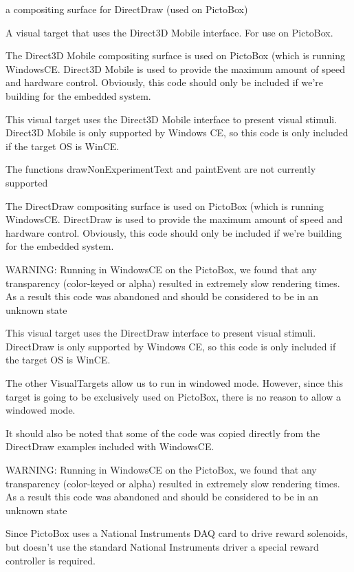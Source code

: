 a compositing surface for Direct\-Draw (used on Picto\-Box)

A visual target that uses the Direct3\-D Mobile interface. For use on Picto\-Box.

The Direct3\-D Mobile compositing surface is used on Picto\-Box (which is running Windows\-C\-E. Direct3\-D Mobile is used to provide the maximum amount of speed and hardware control. Obviously, this code should only be included if we're building for the embedded system.

This visual target uses the Direct3\-D Mobile interface to present visual stimuli. Direct3\-D Mobile is only supported by Windows C\-E, so this code is only included if the target O\-S is Win\-C\-E.

The functions draw\-Non\-Experiment\-Text and paint\-Event are not currently supported

The Direct\-Draw compositing surface is used on Picto\-Box (which is running Windows\-C\-E. Direct\-Draw is used to provide the maximum amount of speed and hardware control. Obviously, this code should only be included if we're building for the embedded system.

W\-A\-R\-N\-I\-N\-G\-: Running in Windows\-C\-E on the Picto\-Box, we found that any transparency (color-\/keyed or alpha) resulted in extremely slow rendering times. As a result this code was abandoned and should be considered to be in an unknown state

This visual target uses the Direct\-Draw interface to present visual stimuli. Direct\-Draw is only supported by Windows C\-E, so this code is only included if the target O\-S is Win\-C\-E.

The other Visual\-Targets allow us to run in windowed mode. However, since this target is going to be exclusively used on Picto\-Box, there is no reason to allow a windowed mode.

It should also be noted that some of the code was copied directly from the Direct\-Draw examples included with Windows\-C\-E.

W\-A\-R\-N\-I\-N\-G\-: Running in Windows\-C\-E on the Picto\-Box, we found that any transparency (color-\/keyed or alpha) resulted in extremely slow rendering times. As a result this code was abandoned and should be considered to be in an unknown state

Since Picto\-Box uses a National Instruments D\-A\-Q card to drive reward solenoids, but doesn't use the standard National Instruments driver a special reward controller is required. 

